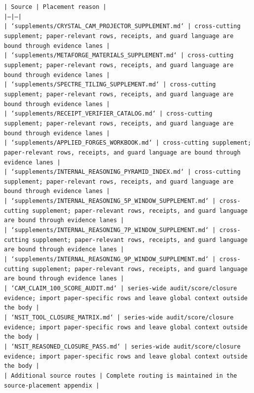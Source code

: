 \documentclass[11pt]{article}
\begin{document}
\noindent\texttt{| Source | Placement reason |}\\
\noindent\texttt{|---|---|}\\
\noindent\texttt{| `supplements/CRYSTAL\_CAM\_PROJECTOR\_SUPPLEMENT.md` | cross-cutting supplement; paper-relevant rows, receipts, and guard language are bound through evidence lanes |}\\
\noindent\texttt{| `supplements/METAFORGE\_MATERIALS\_SUPPLEMENT.md` | cross-cutting supplement; paper-relevant rows, receipts, and guard language are bound through evidence lanes |}\\
\noindent\texttt{| `supplements/SPECTRE\_TILING\_SUPPLEMENT.md` | cross-cutting supplement; paper-relevant rows, receipts, and guard language are bound through evidence lanes |}\\
\noindent\texttt{| `supplements/RECEIPT\_VERIFIER\_CATALOG.md` | cross-cutting supplement; paper-relevant rows, receipts, and guard language are bound through evidence lanes |}\\
\noindent\texttt{| `supplements/APPLIED\_FORGES\_WORKBOOK.md` | cross-cutting supplement; paper-relevant rows, receipts, and guard language are bound through evidence lanes |}\\
\noindent\texttt{| `supplements/INTERNAL\_REASONING\_PYRAMID\_INDEX.md` | cross-cutting supplement; paper-relevant rows, receipts, and guard language are bound through evidence lanes |}\\
\noindent\texttt{| `supplements/INTERNAL\_REASONING\_5P\_WINDOW\_SUPPLEMENT.md` | cross-cutting supplement; paper-relevant rows, receipts, and guard language are bound through evidence lanes |}\\
\noindent\texttt{| `supplements/INTERNAL\_REASONING\_7P\_WINDOW\_SUPPLEMENT.md` | cross-cutting supplement; paper-relevant rows, receipts, and guard language are bound through evidence lanes |}\\
\noindent\texttt{| `supplements/INTERNAL\_REASONING\_9P\_WINDOW\_SUPPLEMENT.md` | cross-cutting supplement; paper-relevant rows, receipts, and guard language are bound through evidence lanes |}\\
\noindent\texttt{| `CAM\_CLAIM\_100\_SCORE\_AUDIT.md` | series-wide audit/score/closure evidence; import paper-specific rows and leave global context outside the body |}\\
\noindent\texttt{| `NSIT\_TOOL\_CLOSURE\_MATRIX.md` | series-wide audit/score/closure evidence; import paper-specific rows and leave global context outside the body |}\\
\noindent\texttt{| `NSIT\_REASONED\_CLOSURE\_PASS.md` | series-wide audit/score/closure evidence; import paper-specific rows and leave global context outside the body |}\\
\noindent\texttt{| Additional source routes | Complete routing is maintained in the source-placement appendix |}\\
\end{document}

